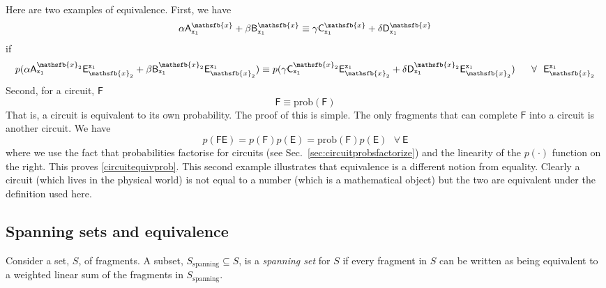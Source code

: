 \documentclass[10pt]{article}
\begin{document}
Here are two examples of equivalence.  First, we have
\begin{equation}\label{equivexample1}
\alpha\mathsf{A}_{\mathtt{x}_1}^{\mathsfb{x}} + \beta\mathsf{B}_{\mathtt{x}_1}^{\mathsfb{x}} \equiv
\gamma \mathsf{C}_{\mathtt{x}_1}^{\mathsfb{x}} + \delta \mathsf{D}_{\mathtt{x}_1}^{\mathsfb{x}}
\end{equation}
if
\begin{equation}
p(\alpha\mathsf{A}_{\mathtt{x}_1}^{\mathsfb{x}_2} \mathsf{E}^{\mathtt{x}_1}_{\mathsfb{x}_2} + \beta\mathsf{B}_{\mathtt{x}_1}^{\mathsfb{x}_2}\mathsf{E}^{\mathtt{x}_1}_{\mathsfb{x}_2} )
\equiv
p(\gamma \mathsf{C}_{\mathtt{x}_1}^{\mathsfb{x}_2}\mathsf{E}^{\mathtt{x}_1}_{\mathsfb{x}_2} +
\delta\mathsf{D}_{\mathtt{x}_1}^{\mathsfb{x}_2}\mathsf{E}^{\mathtt{x}_1}_{\mathsfb{x}_2})  ~~~~~ \forall ~~ \mathsf{E}^{\mathtt{x}_1}_{\mathsfb{x}_2}
\end{equation}
Second, for a circuit, $\mathsf F$
\begin{equation}\label{circuitequivprob}
\mathsf{F} \equiv \text{prob}(\mathsf{F})
\end{equation}
That is, a circuit is equivalent to its own probability.  The proof of this is simple.  The only fragments that can complete $\mathsf{F}$  into a circuit is another circuit.  We have
\begin{equation}
p(\mathsf{F}\mathsf{E})= p(\mathsf{F})p(\mathsf{E}) = \text{prob}(\mathsf{F})p(\mathsf{E})  ~~~\forall ~\mathsf{E}
\end{equation}
where we use the fact that probabilities factorise for circuits (see Sec.\ \ref{sec:circuitprobsfactorize}) and the linearity of the $p(\cdot)$ function on the right.  This proves \eqref{circuitequivprob}.  This second example illustrates that equivalence is a different notion from equality.  Clearly a circuit (which lives in the physical world) is not equal to a number (which is a mathematical object) but the two are equivalent under the definition used here.

\subsection{Spanning sets and equivalence}\label{sec:spanningsetsandequivalence}


Consider a set, $S$, of fragments. A subset, $S_\text{spanning}\subseteq S$, is a \emph{spanning set} for $S$ if every fragment in $S$ can be written as being equivalent to a weighted linear sum of the fragments in $S_\text{spanning}$.
\end{document}
